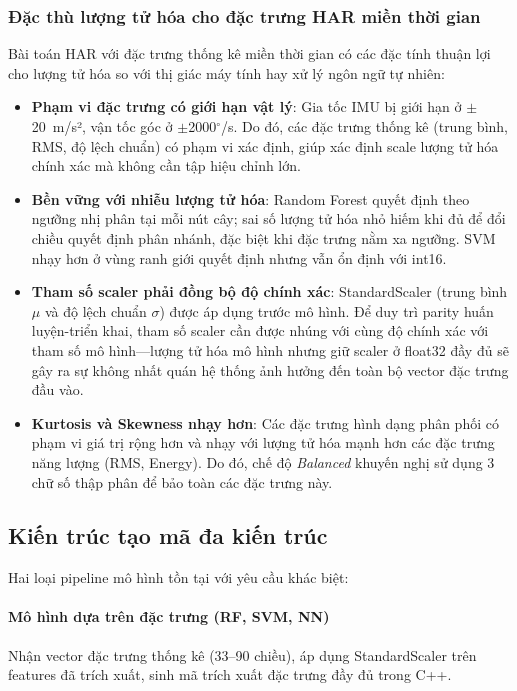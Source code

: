 \subsubsection{Đặc thù lượng tử hóa cho đặc trưng HAR miền thời gian}

Bài toán HAR với đặc trưng thống kê miền thời gian có các đặc tính thuận lợi cho lượng tử hóa so với thị giác máy tính hay xử lý ngôn ngữ tự nhiên:

\begin{itemize}
    \item \textbf{Phạm vi đặc trưng có giới hạn vật lý}: Gia tốc IMU bị giới hạn ở $\pm$20~m/s², vận tốc góc ở $\pm$2000$^\circ$/s. Do đó, các đặc trưng thống kê (trung bình, RMS, độ lệch chuẩn) có phạm vi xác định, giúp xác định scale lượng tử hóa chính xác mà không cần tập hiệu chỉnh lớn.
    \item \textbf{Bền vững với nhiễu lượng tử hóa}: Random Forest quyết định theo ngưỡng nhị phân tại mỗi nút cây; sai số lượng tử hóa nhỏ hiếm khi đủ để đổi chiều quyết định phân nhánh, đặc biệt khi đặc trưng nằm xa ngưỡng. SVM nhạy hơn ở vùng ranh giới quyết định nhưng vẫn ổn định với int16.
    \item \textbf{Tham số scaler phải đồng bộ độ chính xác}: StandardScaler (trung bình $\mu$ và độ lệch chuẩn $\sigma$) được áp dụng trước mô hình. Để duy trì parity huấn luyện-triển khai, tham số scaler cần được nhúng với cùng độ chính xác với tham số mô hình---lượng tử hóa mô hình nhưng giữ scaler ở float32 đầy đủ sẽ gây ra sự không nhất quán hệ thống ảnh hưởng đến toàn bộ vector đặc trưng đầu vào.
    \item \textbf{Kurtosis và Skewness nhạy hơn}: Các đặc trưng hình dạng phân phối có phạm vi giá trị rộng hơn và nhạy với lượng tử hóa mạnh hơn các đặc trưng năng lượng (RMS, Energy). Do đó, chế độ \textit{Balanced} khuyến nghị sử dụng 3 chữ số thập phân để bảo toàn các đặc trưng này.
\end{itemize}

\subsection{Kiến trúc tạo mã đa kiến trúc}
\label{sec:multi_architecture_codegen}

Hai loại pipeline mô hình tồn tại với yêu cầu khác biệt:

\paragraph{Mô hình dựa trên đặc trưng (RF, SVM, NN)}
Nhận vector đặc trưng thống kê (33--90 chiều), áp dụng StandardScaler trên features đã trích xuất, sinh mã trích xuất đặc trưng đầy đủ trong C++.

